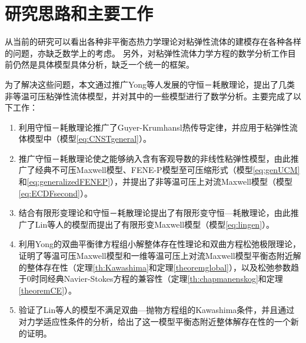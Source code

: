 \section{研究思路和主要工作}
从当前的研究可以看出各种非平衡态热力学理论对粘弹性流体的建模存在各种各样的问题，亦缺乏数学上的考虑。%
另外，对粘弹性流体力学方程的数学分析工作目前仍然是具体模型具体分析，缺乏一个统一的框架。

为了解决这些问题，本文通过推广Yong等人发展的守恒－耗散理论，提出了几类非等温可压粘弹性流体模型，并对其中的一些模型进行了数学分析。主要完成了以下工作：
\begin{enumerate}
\item 利用守恒－耗散理论推广了Guyer-Krumhansl热传导定律，并应用于粘弹性流体模型中（模型\eqref{eq:CNSTgeneral}）。
\item 推广守恒－耗散理论使之能够纳入含有客观导数的非线性粘弹性模型，由此推广了经典不可压Maxwell模型、FENE-P模型至可压缩形式（模型\eqref{eq:genUCM}和\eqref{eq:generalizedFENEP}），并提出了非等温可压上对流Maxwell模型（模型\eqref{eq:ECDFsecond}）。
\item 结合有限形变理论和守恒－耗散理论提出了有限形变守恒—耗散理论，由此推广了Lin等人的模型而提出了有限形变Maxwell模型（模型\eqref{eq:lingen}）。
\item 利用Yong的双曲平衡律方程组小解整体存在性理论和双曲方程松弛极限理论，证明了等温可压Maxwell模型和一维等温可压上对流Maxwell模型平衡态附近解的整体存在性（定理\ref{th:Kawashima}和定理\ref{theoremglobal}），以及松弛参数趋于$0$时同经典Navier-Stokes方程的兼容性（定理\ref{th:chapmanenskog}和定理\ref{theoremCE}）。
\item 验证了Lin等人的模型不满足双曲—抛物方程组的Kawashima条件，并且通过对力学适应性条件的分析，给出了这一模型平衡态附近整体解存在性的一个新的证明。
\end{enumerate}


